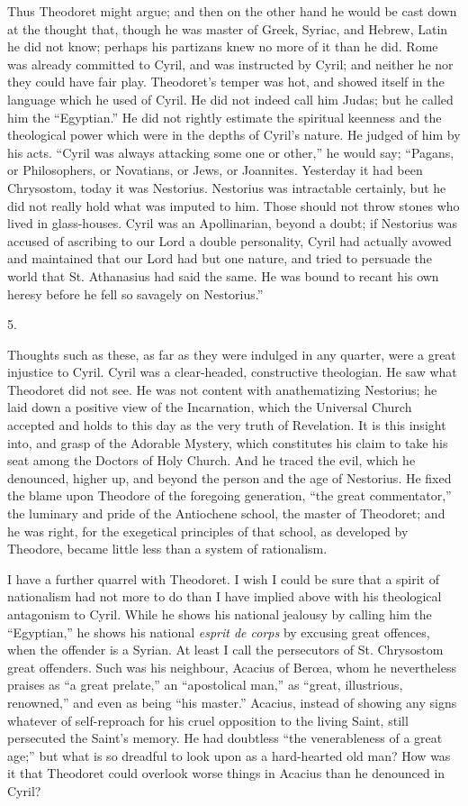 Thus Theodoret might argue; and then on the other hand he would be
cast down at the thought that, though he was master of Greek, Syriac,
and Hebrew, Latin he did not know; perhaps his partizans knew no more
of it than he did. Rome was already committed to Cyril, and was
instructed by Cyril; and neither he nor they could have fair play.
Theodoret's temper was hot, and showed itself in the language which he
used of Cyril. He did not indeed call him Judas; but he called him the
``Egyptian.'' He did not rightly estimate the spiritual
keenness and the theological power which were in the depths of Cyril's
nature. He judged of him by his acts. ``Cyril was always attacking
some one or other,'' he would say; ``Pagans, or Philosophers,
or Novatians, or Jews, or Joannites. Yesterday it had been Chrysostom,
today it was Nestorius. Nestorius was intractable certainly, but he
did not really hold what was imputed to him. Those should not throw
stones who lived in glass-houses. Cyril was an Apollinarian, beyond a
doubt; if Nestorius was accused of ascribing to our Lord a double
personality, Cyril had actually avowed and maintained that our Lord
had but one nature, and tried to persuade the world that St.
Athanasius had said the same. He was bound to recant his own
heresy before he fell so savagely on Nestorius.''

5.

Thoughts such as these, as far as they were indulged in any
quarter, were a great injustice to Cyril. Cyril was a clear-headed,
constructive theologian. He saw what Theodoret did not see. He was not
content with anathematizing Nestorius; he laid down a positive view of
the Incarnation, which the Universal Church accepted and holds to this
day as the very truth of Revelation. It is this insight into, and
grasp of the Adorable Mystery, which constitutes his claim to take his
seat among the Doctors of Holy Church. And he traced the evil, which
he denounced, higher up, and beyond the person and the age of
Nestorius. He fixed the blame upon Theodore of the foregoing
generation, ``the great commentator,'' the luminary and pride
of the Antiochene school, the master of Theodoret; and he was right,
for the exegetical principles of that school, as developed by
Theodore, became little less than a system of rationalism.

I have a further quarrel with Theodoret. I wish I could be sure
that a spirit of nationalism had not more to do than I have implied
above with his theological antagonism to Cyril. While he shows his
national jealousy by calling him the ``Egyptian,'' he shows
his national \emph{esprit de corps} by excusing great offences, when
the offender is a Syrian. At least I call the persecutors of St.
Chrysostom great offenders. Such was his neighbour, Acacius of Berœa,
whom he nevertheless praises as ``a great prelate,'' an ``apostolical
man,'' as ``great, illustrious, renowned,'' and even as
being ``his master.'' Acacius, instead of showing any signs
whatever of self-reproach for his cruel opposition to the living
Saint, still persecuted the Saint's memory. He had doubtless
``the venerableness of a great age;'' but what is so dreadful
to look upon as a hard-hearted old man? How was it that Theodoret
could overlook worse things in Acacius than he denounced in Cyril?

